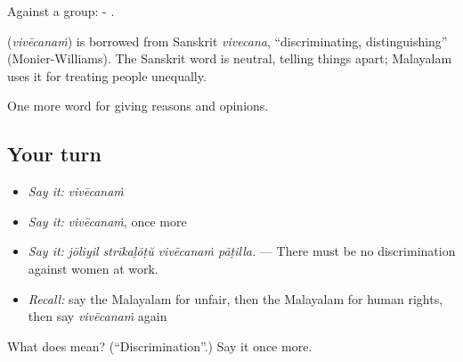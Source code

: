 Against a group: - .

\begin{cousinweb}
\textbf{} (\emph{vivēcanaṁ}) is borrowed from Sanskrit \emph{vivecana}, \textquotedblleft{}discriminating, distinguishing\textquotedblright{} (Monier-Williams). The Sanskrit word is neutral, telling things apart; Malayalam uses it for treating people unequally.
\end{cousinweb}

\begin{grammarlens}[title={What you've built}]
One more word for giving reasons and opinions.
\end{grammarlens}

\subsection*{Your turn}
\begin{itemize}
\raggedright
  \item \emph{Say it:} \emph{vivēcanaṁ}
  \item \emph{Say it:} \emph{vivēcanaṁ}, once more
  \item \emph{Say it:} \emph{jōliyil strīkaḷōṭŭ vivēcanaṁ pāṭilla.} — There must be no discrimination against women at work.
  \item \emph{Recall:} say the Malayalam for unfair, then the Malayalam for human rights, then say \emph{vivēcanaṁ} again
\end{itemize}

\begin{tcolorbox}[breakable,colback=teal!4,colframe=teal!35!black,title={Before you move on}]
What does  mean? (\textquotedblleft{}Discrimination\textquotedblright{}.) Say it once more.
\end{tcolorbox}
